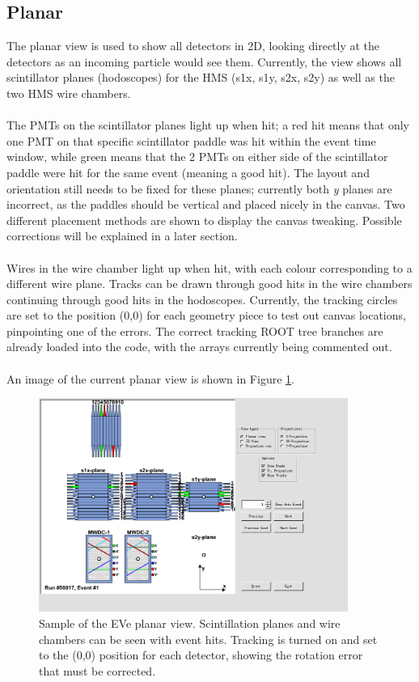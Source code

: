 \documentclass[12pt]{article}
\numberwithin{equation}{section}
\begin{document}
\subsection{Planar}
The planar view is used to show all detectors in 2D, looking directly at the detectors as an incoming particle would see them. Currently, the view shows all scintillator planes (hodoscopes) for the HMS (s1x, s1y, s2x, s2y) as well as the two HMS wire chambers. 
\\
\\
The PMTs on the scintillator planes light up when hit; a red hit means that only one PMT on that specific scintillator paddle was hit within the event time window, while green means that the 2 PMTs on either side of the scintillator paddle were hit for the same event (meaning a good hit). The layout and orientation still needs to be fixed for these planes; currently both \textit{y} planes are incorrect, as the paddles should be vertical and placed nicely in the canvas. Two different placement methods are shown to display the canvas tweaking. Possible corrections will be explained in a later section.
\\
\\
Wires in the wire chamber light up when hit, with each colour corresponding to a different wire plane. Tracks can be drawn through good hits in the wire chambers continuing through good hits in the hodoscopes. Currently, the tracking circles are set to the position (0,0) for each geometry piece to test out canvas locations, pinpointing one of the errors. The correct tracking ROOT tree branches are already loaded into the code, with the arrays currently being commented out.  
\\
\\
An image of the current planar view is shown in Figure \ref{fig:planar}.
\begin{figure}[h!]
	\caption{Sample of the EVe planar view. Scintillation planes and wire chambers can be seen with event hits. Tracking is turned on and set to the (0,0) position for each detector, showing the rotation error that must be corrected.} \label{fig:planar}
	\centering
	\includegraphics[width=0.9\textwidth]{PlanarView.png} 
\end{figure}  
\end{document}
